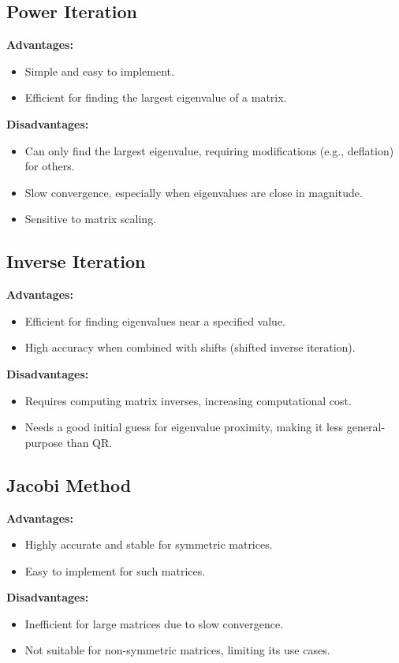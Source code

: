 \documentclass[12pt]{article}
\begin{document}
\subsection{Power Iteration}
\textbf{Advantages:}
\begin{itemize}
    \item Simple and easy to implement.
    \item Efficient for finding the largest eigenvalue of a matrix.
\end{itemize}
\textbf{Disadvantages:}
\begin{itemize}
    \item Can only find the largest eigenvalue, requiring modifications (e.g., deflation) for others.
    \item Slow convergence, especially when eigenvalues are close in magnitude.
    \item Sensitive to matrix scaling.
\end{itemize}

\subsection{Inverse Iteration}
\textbf{Advantages:}
\begin{itemize}
    \item Efficient for finding eigenvalues near a specified value.
    \item High accuracy when combined with shifts (shifted inverse iteration).
\end{itemize}
\textbf{Disadvantages:}
\begin{itemize}
    \item Requires computing matrix inverses, increasing computational cost.
    \item Needs a good initial guess for eigenvalue proximity, making it less general-purpose than QR.
\end{itemize}

\subsection{Jacobi Method}
\textbf{Advantages:}
\begin{itemize}
    \item Highly accurate and stable for symmetric matrices.
    \item Easy to implement for such matrices.
\end{itemize}
\textbf{Disadvantages:}
\begin{itemize}
    \item Inefficient for large matrices due to slow convergence.
    \item Not suitable for non-symmetric matrices, limiting its use cases.
\end{itemize}
\end{document}
